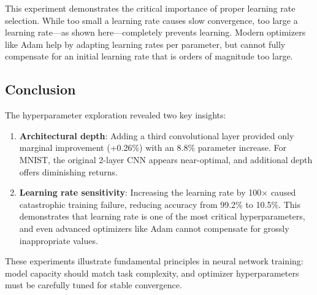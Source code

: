This experiment demonstrates the critical importance of proper learning rate selection. While too small a learning rate causes slow convergence, too large a learning rate---as shown here---completely prevents learning. Modern optimizers like Adam help by adapting learning rates per parameter, but cannot fully compensate for an initial learning rate that is orders of magnitude too large.

\subsection{Conclusion}

The hyperparameter exploration revealed two key insights:

\begin{enumerate}
    \item \textbf{Architectural depth}: Adding a third convolutional layer provided only marginal improvement (+0.26\%) with an 8.8\% parameter increase. For MNIST, the original 2-layer CNN appears near-optimal, and additional depth offers diminishing returns.
    
    \item \textbf{Learning rate sensitivity}: Increasing the learning rate by 100$\times$ caused catastrophic training failure, reducing accuracy from 99.2\% to 10.5\%. This demonstrates that learning rate is one of the most critical hyperparameters, and even advanced optimizers like Adam cannot compensate for grossly inappropriate values.
\end{enumerate}

These experiments illustrate fundamental principles in neural network training: model capacity should match task complexity, and optimizer hyperparameters must be carefully tuned for stable convergence.